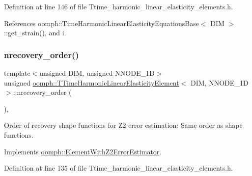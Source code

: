 Definition at line 146 of file Ttime\+\_\+harmonic\+\_\+linear\+\_\+elasticity\+\_\+elements.\+h.



References oomph\+::\+Time\+Harmonic\+Linear\+Elasticity\+Equations\+Base$<$ D\+I\+M $>$\+::get\+\_\+strain(), and i.

\mbox{\label{classoomph_1_1TTimeHarmonicLinearElasticityElement_a15e0965ae89f4c6523fe61784aada176}} 
\subsubsection{\texorpdfstring{nrecovery\+\_\+order()}{nrecovery\_order()}}
{\footnotesize\ttfamily template$<$unsigned D\+IM, unsigned N\+N\+O\+D\+E\+\_\+1D$>$ \\
unsigned \hyperlink{classoomph_1_1TTimeHarmonicLinearElasticityElement}{oomph\+::\+T\+Time\+Harmonic\+Linear\+Elasticity\+Element}$<$ D\+IM, N\+N\+O\+D\+E\+\_\+1D $>$\+::nrecovery\+\_\+order (\begin{DoxyParamCaption}{ }\end{DoxyParamCaption})\hspace{0.3cm}{\ttfamily [inline]}, {\ttfamily [virtual]}}



Order of recovery shape functions for Z2 error estimation\+: Same order as shape functions. 



Implements \hyperlink{classoomph_1_1ElementWithZ2ErrorEstimator_af39480835bd3e0f6b2f4f7a9a4044798}{oomph\+::\+Element\+With\+Z2\+Error\+Estimator}.



Definition at line 135 of file Ttime\+\_\+harmonic\+\_\+linear\+\_\+elasticity\+\_\+elements.\+h.

\mbox{\label{classoomph_1_1TTimeHarmonicLinearElasticityElement_a5cce049fe8015dc639df9b028a6b187e}} 
